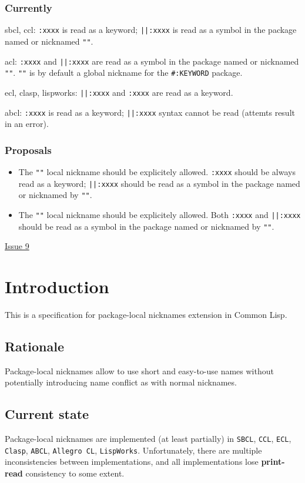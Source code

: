 \documentclass[11pt]{article}
\begin{document}
\subsubsection{Currently}
\label{sec:org95be0e6}
sbcl, ccl:
\texttt{:xxxx} is read as a keyword;
\texttt{||:xxxx} is read as a symbol in the package named or nicknamed \texttt{""}.

acl:
\texttt{:xxxx} and \texttt{||:xxxx} are read as a symbol in the package named or nicknamed \texttt{""}.
\texttt{""} is by default a global nickname for the \texttt{\#:KEYWORD} package.

ecl, clasp, lispworks:
\texttt{||:xxxx} and \texttt{:xxxx} are read as a keyword.

abcl:
\texttt{:xxxx} is read as a keyword;
\texttt{||:xxxx} syntax cannot be read (attemts result in an error).
\subsubsection{Proposals}
\label{sec:org45c8c10}
\begin{itemize}
\item The \texttt{""} local nickname should be explicitely allowed.
\texttt{:xxxx} should be always read as a keyword;
\texttt{||:xxxx} should be read as a symbol in the package named or nicknamed by \texttt{""}.
\item The \texttt{""} local nickname should be explicitely allowed.
Both \texttt{:xxxx} and \texttt{||:xxxx} should be read as a symbol in the package
named or nicknamed by \texttt{""}.
\end{itemize}
\href{./issues/9.org}{Issue 9}
\section{Introduction}
\label{sec:org8abd23a}
This is a specification for package-local nicknames extension in Common Lisp.
\subsection{Rationale}
\label{sec:orgb1080cc}
Package-local nicknames allow to use short and easy-to-use names without
potentially introducing name conflict as with normal nicknames.
\subsection{Current state}
\label{sec:orgf381b59}
Package-local nicknames are implemented (at least partially) in \texttt{SBCL},
\texttt{CCL}, \texttt{ECL}, \texttt{Clasp}, \texttt{ABCL}, \texttt{Allegro CL}, \texttt{LispWorks}. Unfortunately,
there are multiple inconsistencies between implementations, and all
implementations lose \textbf{print-read} consistency to some extent.
\end{document}
